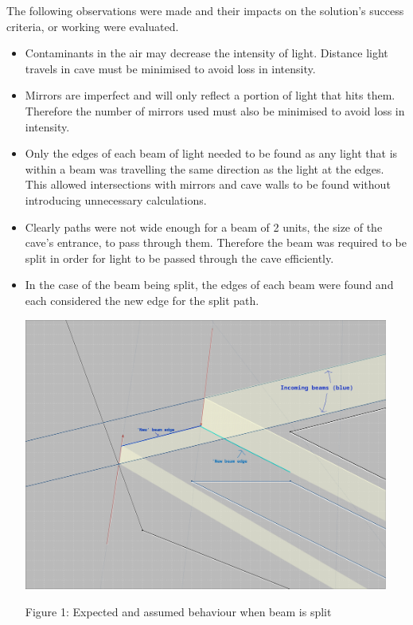 \documentclass[11pt, letterpaper]{article}
\begin{document}
The following observations were made and their impacts on the solution's success criteria, or working were evaluated.
\begin{itemize}




\item Contaminants in the air may decrease the intensity of light. Distance light travels in cave must be minimised to avoid loss in intensity.

\item Mirrors are imperfect and will only reflect a portion of light that hits them.  Therefore the number of mirrors used must also be minimised to avoid loss in intensity.

\item Only the edges of each beam of light needed to be found as any light that is within a beam was travelling the same direction as the light at the edges. This allowed intersections with mirrors and cave walls to be found without introducing unnecessary calculations.

\item Clearly paths were not wide enough for a beam of 2 units, the size of the cave's entrance, to pass through them. Therefore the beam was required to be split in order for light to be passed through the cave efficiently.

\item In the case of the beam being split, the edges of each beam were found and each considered the new edge for the split path.
\newline
\begin{center}
\includegraphics[width = 12cm]{new diagram.jpg}

{Figure 1: Expected and assumed behaviour when beam is split}
\end{center}
\end{itemize}
\end{document}
